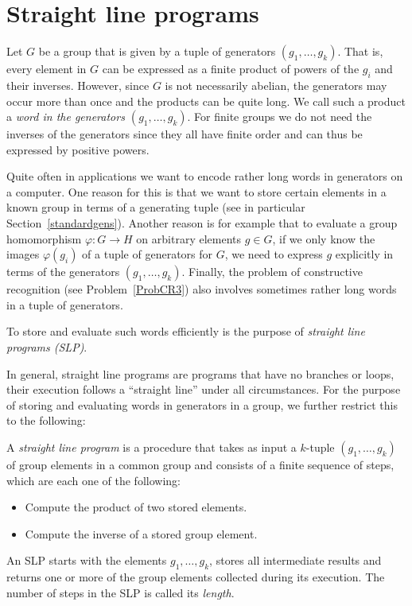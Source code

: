 \section{Straight line programs}
\label{slp}

%
Let $G$ be a group that is given by a tuple of generators $(g_1,
\ldots, g_k)$. That is, every element in $G$ can be expressed as a
finite product of powers of the $g_i$ and their inverses. However,
since $G$ is not necessarily abelian, the generators may occur more
than once and the products can be quite long. We call such a product a 
\emph{word in the generators $(g_1, \ldots, g_k)$}. 
%
For finite groups we do not need the
inverses of the generators since they all have finite order and can
thus be expressed by positive powers.

Quite often in applications we want to encode rather long words in
generators on a computer. One reason for this is that we want to store certain
elements in a known group in terms of a generating tuple (see in
particular Section~\ref{standardgens}). Another reason is for example that to
evaluate a group homomorphism $\varphi:G \to H$ on arbitrary elements
$g \in G$, if we only know the images $\varphi(g_i)$ of a tuple of
generators for $G$, we need to express $g$ explicitly in terms of
the generators $(g_1, \ldots, g_k)$. Finally, the problem of constructive
recognition (see Problem~\ref{ProbCR3}) also involves sometimes rather
%
long words in a tuple of generators.

To store and evaluate such words efficiently is the purpose of
\emph{straight line programs (SLP)}.

In general, straight line programs are programs that have no branches
or loops, their execution follows a ``straight line'' under all
circumstances. For the purpose of storing and evaluating words in
generators in a group, we further restrict this to the following:

\begin{Def}
    \label{defslp}%
    A \emph{straight line program} is a procedure that takes as input a
    $k$-tuple $(g_1, \ldots, g_k)$ of group elements in a 
    common group and consists of a finite 
    sequence of steps, which are each one of the following:
\begin{itemize}
    \item Compute the product of two stored elements.
    \item Compute the inverse of a stored group element.
\end{itemize}
    An SLP starts with the elements $g_1, \ldots, g_k$,
    stores all intermediate results and returns one or more of the 
    group elements collected during its execution. The number of
    steps in the SLP is called its \emph{length}.
\end{Def}

